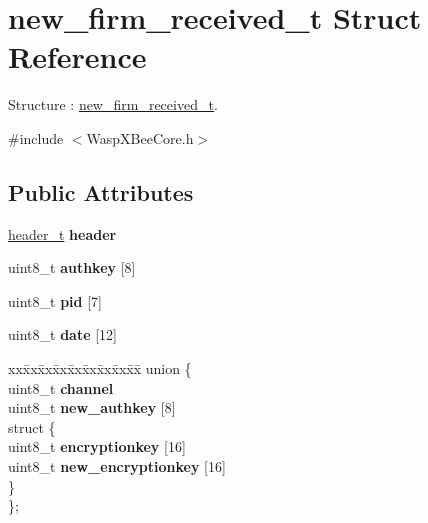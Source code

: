 \hypertarget{structnew__firm__received__t}{}\section{new\+\_\+firm\+\_\+received\+\_\+t Struct Reference}
\label{structnew__firm__received__t}


Structure \+: \hyperlink{structnew__firm__received__t}{new\+\_\+firm\+\_\+received\+\_\+t}.  




{\ttfamily \#include $<$Wasp\+X\+Bee\+Core.\+h$>$}

\subsection*{Public Attributes}
\begin{DoxyCompactItemize}
\item 
\hyperlink{structheader__t}{header\+\_\+t} {\bfseries header}\hypertarget{structnew__firm__received__t_afd0aec41f79afaedcc57dbf833425d06}{}\label{structnew__firm__received__t_afd0aec41f79afaedcc57dbf833425d06}

\item 
uint8\+\_\+t {\bfseries authkey} \mbox{[}8\mbox{]}\hypertarget{structnew__firm__received__t_a781d3733d279402c40dd1eb4a86f0ad0}{}\label{structnew__firm__received__t_a781d3733d279402c40dd1eb4a86f0ad0}

\item 
uint8\+\_\+t {\bfseries pid} \mbox{[}7\mbox{]}\hypertarget{structnew__firm__received__t_acd1f634461fc97212d62202672d2c5ba}{}\label{structnew__firm__received__t_acd1f634461fc97212d62202672d2c5ba}

\item 
uint8\+\_\+t {\bfseries date} \mbox{[}12\mbox{]}\hypertarget{structnew__firm__received__t_af0b82e4a60ced83a9b358fdb9b947785}{}\label{structnew__firm__received__t_af0b82e4a60ced83a9b358fdb9b947785}

\item 
\begin{tabbing}
xx\=xx\=xx\=xx\=xx\=xx\=xx\=xx\=xx\=\kill
union \{\\
\>uint8\_t {\bfseries channel}\\
\>uint8\_t {\bfseries new\_authkey} \mbox{[}8\mbox{]}\\
\>struct \{\\
\>\>uint8\_t {\bfseries encryptionkey} \mbox{[}16\mbox{]}\\
\>\>uint8\_t {\bfseries new\_encryptionkey} \mbox{[}16\mbox{]}\\
\>\} \hypertarget{unionnew__firm__received__t_1_1_0D12_affd6b4c1ec8b64712fe43cc91c9f97f4}{}\label{unionnew__firm__received__t_1_1_0D12_affd6b4c1ec8b64712fe43cc91c9f97f4}
\\
\}; \hypertarget{structnew__firm__received__t_a3d21b554117f9f6e16912a44d5c5d6d6}{}\label{structnew__firm__received__t_a3d21b554117f9f6e16912a44d5c5d6d6}
\\

\end{tabbing}\end{DoxyCompactItemize}


